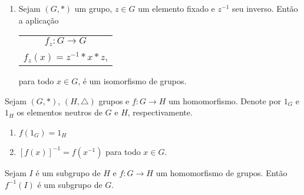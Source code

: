 \documentclass{beamer}
\begin{document}
    \begin{frame}
        \begin{exemplos}
            \begin{enumerate}[label={\arabic*})]
                \conti

                \item Sejam $(G, *)$ um grupo, \pause $z\in G$ um elemento fixado \pause e $z^{-1}$ seu inverso. \pause Então a aplicação\pause
                \begin{center}
                    \begin{tabular}{c}
                        $f_z: G\to G$\pause\\
                        $f_z(x) = z^{-1}*x*z$,\pause
                    \end{tabular}
                \end{center}
                 para todo $x \in G$, é um isomorfismo de grupos.
            \end{enumerate}
            \vspace{.5cm}
        \end{exemplos}
    \end{frame}

    \begin{frame}
        \begin{proposicao}
            Sejam $(G, *)$, \pause $(H, \triangle)$ grupos \pause e $f : G \to H$ um homomorfismo. \pause Denote por $1_G$ \pause e $1_H$ \pause os elementos neutros de $G$ e $H$, \pause respectivamente.\pause
            \vspace{.5cm}
            \begin{enumerate}[label={\roman*})]
                \item $f(1_G) = 1_H$\pause

                \vspace{.5cm}

                \item $[f(x)]^{-1} = f(x^{-1})$ \pause para todo $x \in G$.
                \vspace{.5cm}
            \end{enumerate}
        \end{proposicao}
    \end{frame}

    \begin{frame}
        \begin{proposicao}
            Sejam $I$ é um subgrupo de $H$ \pause e $f : G \to H$ \pause um homomorfismo de grupos. \pause Então $f^{-1}(I)$ \pause é um subgrupo de $G$.
        \end{proposicao}

        \vspace{2cm}
    \end{frame}
\end{document}
